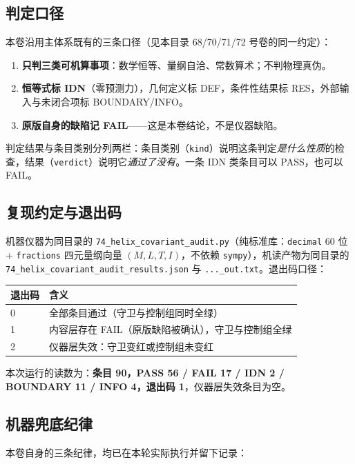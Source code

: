 \documentclass[UTF8,fontset=fandol,11pt]{ctexart}
\newcommand{\code}[1]{\texttt{#1}}
\begin{document}
\subsection{判定口径}
本卷沿用主体系既有的三条口径（见本目录 68/70/71/72 号卷的同一约定）：

\begin{enumerate}
  \item \textbf{只判三类可机算事项}：数学恒等、量纲自洽、常数算术；不判物理真伪。
  \item \textbf{恒等式标 IDN}（零预测力），几何定义标 DEF，条件性结果标 RES，外部输入与未闭合项标 BOUNDARY/INFO。
  \item \textbf{原版自身的缺陷记 FAIL}——这是本卷结论，不是仪器缺陷。
\end{enumerate}

判定结果与条目类别分列两栏：条目类别（\code{kind}）说明这条判定\emph{是什么性质}的检查，结果（\code{verdict}）说明它\emph{通过了没有}。一条 IDN 类条目可以 PASS，也可以 FAIL。

\subsection{复现约定与退出码}
机器仪器为同目录的 \code{74\_helix\_covariant\_audit.py}（纯标准库：\code{decimal} 60 位 + \code{fractions} 四元量纲向量 $(M,L,T,I)$，不依赖 \code{sympy}），机读产物为同目录的 \code{74\_helix\_covariant\_audit\_results.json} 与 \code{...\_out.txt}。退出码口径：

\begin{center}
\begin{tabular}{ll}
\toprule
退出码 & 含义 \\
\midrule
0 & 全部条目通过（守卫与控制组同时全绿） \\
1 & 内容层存在 FAIL（原版缺陷被确认），守卫与控制组全绿 \\
2 & 仪器层失效：守卫变红或控制组未变红 \\
\bottomrule
\end{tabular}
\end{center}

本次运行的读数为：\textbf{条目 90，PASS 56 / FAIL 17 / IDN 2 / BOUNDARY 11 / INFO 4，退出码 1}，仪器层失效条目为空。

\subsection{机器兜底纪律}
本卷自身的三条纪律，均已在本轮实际执行并留下记录：
\end{document}
